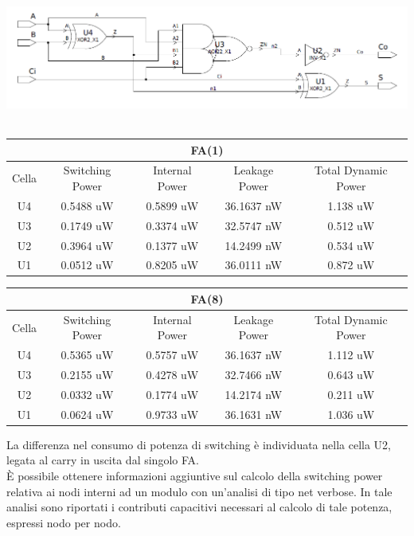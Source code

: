\documentclass[11pt,  english, makeidx, a4paper, titlepage, oneside]{book}
\begin{document}
\includegraphics[width=15cm]{./img/Lab_1/Es_3/Full_adder.png}
\\\\
\begin{center}
	\begin{tabular}{|c|c|c|c|c|}
	\multicolumn{5}{c}{FA(1) }\\
	\hline
	Cella &  Switching Power & Internal Power & Leakage Power & Total Dynamic Power \\ 
	\hline
	U4 & 0.5488 uW & 0.5899 uW & 36.1637 nW & 1.138 uW  \\
	\hline
	U3 & 0.1749 uW & 0.3374 uW & 32.5747 nW & 0.512 uW  \\
	\hline
	U2 & 0.3964 uW & 0.1377 uW & 14.2499 nW & 0.534 uW  \\
	\hline
	U1 & 0.0512 uW & 0.8205 uW & 36.0111 nW & 0.872 uW  \\
	\hline
	\end{tabular}
\end{center}
\vspace{0.3cm}
\begin{center}
	\begin{tabular}{|c|c|c|c|c|}
	\multicolumn{5}{c}{FA(8) }\\
	\hline
	Cella &  Switching Power & Internal Power & Leakage Power & Total Dynamic Power \\ 
	\hline
	U4 & 0.5365 uW & 0.5757 uW & 36.1637 nW & 1.112 uW  \\
	\hline
	U3 & 0.2155 uW & 0.4278 uW & 32.7466 nW & 0.643 uW  \\
	\hline
	U2 & 0.0332 uW & 0.1774 uW & 14.2174 nW & 0.211 uW  \\
	\hline
	U1 & 0.0624 uW & 0.9733 uW & 36.1631 nW & 1.036 uW  \\
	\hline
	\end{tabular}
\end{center}
\vspace{0.3cm}
La differenza nel consumo di potenza di switching è individuata nella cella U2, legata al carry in uscita dal singolo FA.
\\
È possibile ottenere informazioni aggiuntive sul calcolo della switching power relativa ai nodi interni ad un modulo con un'analisi di tipo net verbose. In tale analisi sono riportati i contributi capacitivi necessari al calcolo di tale potenza, espressi nodo per nodo.
\end{document}
